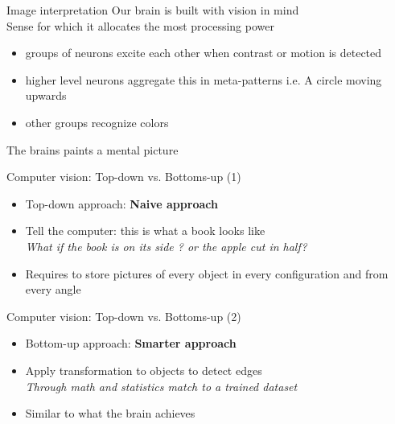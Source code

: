 \documentclass{beamer}
\begin{document}
\begin{frame}{Image interpretation}
Our brain is built with vision in mind \\
Sense for which it allocates the most processing power \\
\begin{itemize}
\item groups of neurons excite each other when contrast or motion is detected
\item higher level neurons aggregate this in meta-patterns i.e. A circle moving upwards
\item other groups recognize colors
\end{itemize}
The brains paints a mental picture
\end{frame}

\begin{frame}{Computer vision: Top-down vs. Bottoms-up (1)}
    \begin{itemize}
        \item Top-down approach: \textbf{Naive approach} \\
        \item Tell the computer: this is what a book looks like \\
            \hspace{0.27cm} \textit{What if the book is on its side ? or the apple cut in half?} \\
        \item Requires to store pictures of every object in every configuration and from every angle
    \end{itemize}
\end{frame}

\begin{frame}{Computer vision: Top-down vs. Bottoms-up (2)}
    \begin{itemize}
        \item Bottom-up approach: \textbf{Smarter approach} \\
        \item Apply transformation to objects to detect edges \\
            \hspace{0.27cm}\textit{Through math and statistics match to a trained dataset} \\
        \item Similar to what the brain achieves

\end{itemize}
    \end{frame}
\end{document}
